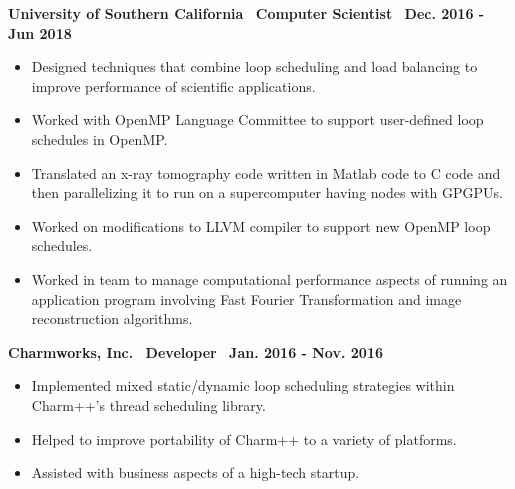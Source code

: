 \textbf{University of Southern California$\>$$\>$$\>$$\>$Computer Scientist$\>$$\>$$\>$$\>$Dec. 2016 - Jun 2018}
\vspace*{-0.0in} 
\begin{itemize}
\item Designed techniques that combine loop scheduling and load balancing to improve performance of scientific applications.
\item Worked with OpenMP Language Committee to support user-defined loop schedules in OpenMP.
\item Translated an x-ray tomography code written in Matlab code to C code and then parallelizing it to run on a supercomputer having nodes with GPGPUs. 
\item Worked on modifications to LLVM compiler to support new OpenMP loop schedules. 
\item Worked in team to manage computational performance aspects of running an application program involving Fast Fourier Transformation and image reconstruction algorithms. 
\end{itemize}

\textbf{Charmworks, Inc.$\>$$\>$$\>$$\>$Developer$\>$$\>$$\>$$\>$Jan. 2016 - Nov. 2016}
\vspace*{-0.0in}
\begin{itemize}
\item Implemented mixed static/dynamic loop scheduling
strategies within Charm++'s thread scheduling library.
\item Helped to improve portability of Charm++ to a variety of platforms. 
\item Assisted with business aspects of a high-tech startup. 
\end{itemize} 

